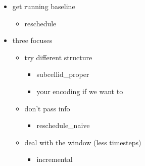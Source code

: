 \color{green}
\begin{itemize}
	\item get running baseline 
	\begin{itemize}
		\item reschedule
	\end{itemize}
	\item three focuses
	\begin{itemize}
		\item try different structure
		\begin{itemize}
			\item subcellid\_proper
			\item your encoding if we want to
		\end{itemize}
		\item don't pass info
		\begin{itemize}
			\item reschedule\_naive
		\end{itemize}
		\item deal with the window (less timesteps)
		\begin{itemize}
			\item incremental
		\end{itemize}
	\end{itemize}
\end{itemize}
\color{black}







